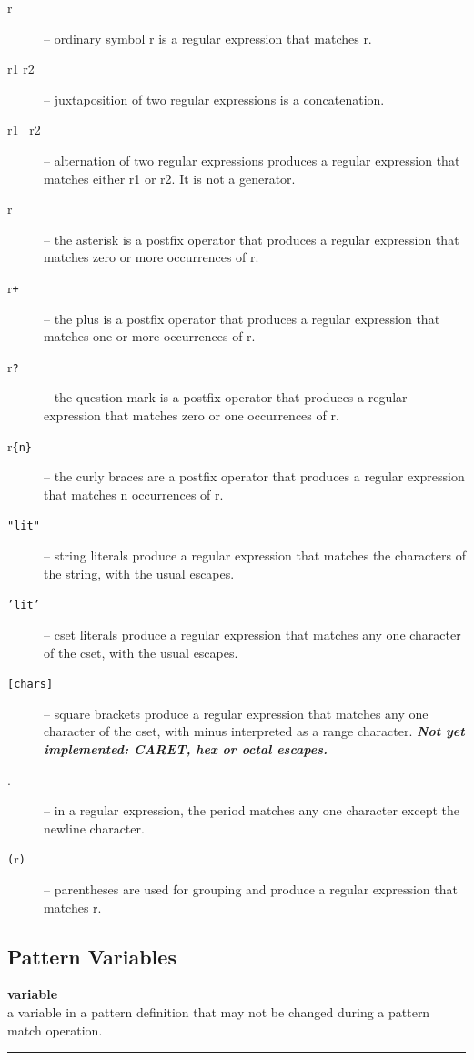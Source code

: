 \documentclass[letterpaper,12pt]{article}
\begin{document}
\begin{description}
\item [r] -- ordinary symbol r is a regular expression that matches r.
\item [r1 r2] -- juxtaposition of two regular expressions is a concatenation.
\item [r1 {\tt \textbar} \ r2] -- alternation of two regular expressions
	produces a regular expression that matches either r1 or r2. It
	is not a generator.
\item [r{\tt *}] -- the asterisk is a postfix operator that produces a
	regular expression that matches zero or more occurrences of r.
\item [r{\tt +}] -- the plus is a postfix operator that produces a
	regular expression that matches one or more occurrences of r.
\item [r{\tt ?}] -- the question mark is a postfix operator that produces a
	regular expression that matches zero or one occurrences of r.
\item [r{\tt \{n\}}] -- the curly braces are a postfix operator that produces a
	regular expression that matches n occurrences of r.
\item [{\tt "lit"}] -- string literals produce a regular expression that
	matches the characters of the string, with the usual escapes.
\item [{\tt 'lit'}] -- cset literals produce a regular expression that
	matches any one character of the cset, with the usual escapes.
\item [{\tt {[}chars{]}}] -- square brackets produce a regular expression that
	matches any one character of the cset, with minus interpreted
	as a range character. {\em\bf Not yet implemented: CARET, hex
	or octal escapes.}
\item [.] -- in a regular expression, the period
	matches any one character except the newline character.
\item [{\tt (}r{\tt )}] -- parentheses are used for grouping and produce a
	regular expression that matches r.
\end{description}


\subsection*{Pattern Variables}

\noindent\textbf{variable} \\
a variable in a pattern definition that may not be changed during a pattern match operation.\\
\noindent\rule{16.5cm}{0.4pt}
 
\end{document}
